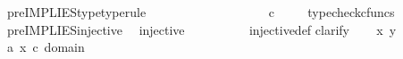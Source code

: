 \begin{isabellebody}
\isanewline
{}\isamarkupfalse%
\ pre{\isacharunderscore}{\kern0pt}IMPLIES{\isacharunderscore}{\kern0pt}type{\isacharbrackleft}{\kern0pt}type{\isacharunderscore}{\kern0pt}rule{\isacharbrackright}{\kern0pt}{\isacharcolon}{\kern0pt}\ \isanewline
\ \ {\isachardoublequoteopen}{\isasymlangle}{\isasymt}{\isacharcomma}{\kern0pt}\ {\isasymt}{\isasymrangle}\ {\isasymamalg}\ {\isacharparenleft}{\kern0pt}{\isasymlangle}{\isasymf}{\isacharcomma}{\kern0pt}\ {\isasymf}{\isasymrangle}\ {\isasymamalg}\ {\isasymlangle}{\isasymf}{\isacharcomma}{\kern0pt}\ {\isasymt}{\isasymrangle}{\isacharparenright}{\kern0pt}\ {\isacharcolon}{\kern0pt}\ {\isasymone}\ {\isasymCoprod}\ {\isacharparenleft}{\kern0pt}{\isasymone}\ {\isasymCoprod}\ {\isasymone}{\isacharparenright}{\kern0pt}\ {\isasymrightarrow}\ {\isasymOmega}\ {\isasymtimes}\isactrlsub c\ {\isasymOmega}{\isachardoublequoteclose}\isanewline
%
\isadelimproof
\ \ %
\endisadelimproof
%
\isatagproof
{}\isamarkupfalse%
\ typecheck{\isacharunderscore}{\kern0pt}cfuncs%
\endisatagproof
{\isafoldproof}%
%
\isadelimproof
\isanewline
%
\endisadelimproof
\isanewline
{}\isamarkupfalse%
\ pre{\isacharunderscore}{\kern0pt}IMPLIES{\isacharunderscore}{\kern0pt}injective{\isacharcolon}{\kern0pt}\isanewline
\ \ {\isachardoublequoteopen}injective{\isacharparenleft}{\kern0pt}{\isasymlangle}{\isasymt}{\isacharcomma}{\kern0pt}\ {\isasymt}{\isasymrangle}\ {\isasymamalg}\ {\isacharparenleft}{\kern0pt}{\isasymlangle}{\isasymf}{\isacharcomma}{\kern0pt}\ {\isasymf}{\isasymrangle}\ {\isasymamalg}{\isasymlangle}{\isasymf}{\isacharcomma}{\kern0pt}\ {\isasymt}{\isasymrangle}{\isacharparenright}{\kern0pt}{\isacharparenright}{\kern0pt}{\isachardoublequoteclose}\isanewline
%
\isadelimproof
\ \ %
\endisadelimproof
%
\isatagproof
{}\isamarkupfalse%
\ injective{\isacharunderscore}{\kern0pt}def\isanewline
{}\isamarkupfalse%
{\isacharparenleft}{\kern0pt}clarify{\isacharparenright}{\kern0pt}\isanewline
\ \ \isamarkupfalse%
\ x\ y\ \isanewline
\ \ \isamarkupfalse%
\ a{}{\isacharcolon}{\kern0pt}\ {\isachardoublequoteopen}x\ {\isasymin}\isactrlsub c\ domain\ {\isacharparenleft}{\kern0pt}{\isasymlangle}{\isasymt}{\isacharcomma}{\kern0pt}{\isasymt}{\isasymrangle}\ {\isasymamalg}\ {\isasymlangle}{\isasymf}{\isacharcomma}{\kern0pt}\ {\isasymf}{\isasymrangle}\ {\isasymamalg}\ {\isasymlangle}{\isasymf}{\isacharcomma}{\kern0pt}{\isasymt}{\isasymrangle}{\isacharparenright}{\kern0pt}{\isachardoublequoteclose}\ \isanewline
\ \ \isamarkupfalse%

\end{isabellebody}
